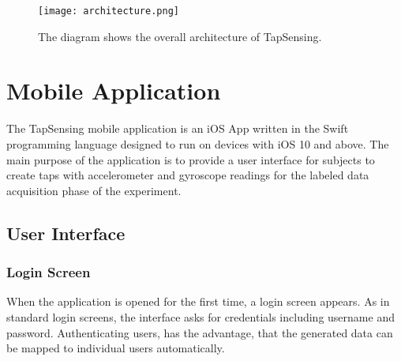 \begin{figure}[h!]
  \centering
  \texttt{[image: architecture.png]}
  \caption{The diagram shows the overall architecture of TapSensing.} \label{fig:architecture}
\end{figure}



\section{Mobile Application}
The TapSensing mobile application is an iOS App written in the Swift programming language designed to run on devices with iOS 10 and above. The main purpose of the application is to provide a user interface for subjects to create taps with accelerometer and gyroscope readings for the labeled data acquisition phase of the experiment.
\label{sec:mobileapp}

\subsection{User Interface}
\subsubsection{Login Screen}
When the application is opened for the first time, a login screen appears. As in standard login screens, the interface asks for credentials including username and password. Authenticating users, has the advantage, that the generated data can be mapped to individual users automatically.
